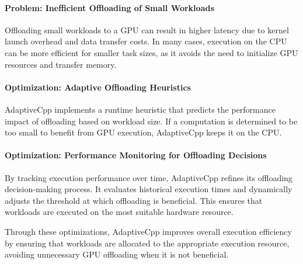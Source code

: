 \paragraph{Problem: Inefficient Offloading of Small Workloads}
Offloading small workloads to a GPU can result in higher latency due to kernel launch overhead and data transfer
costs. In many cases, execution on the CPU can be more efficient for smaller task sizes, as it avoids the need to
initialize GPU resources and transfer memory.

\paragraph{Optimization: Adaptive Offloading Heuristics}
AdaptiveCpp implements a runtime heuristic that predicts the performance impact of offloading based on workload
size. If a computation is determined to be too small to benefit from GPU execution, AdaptiveCpp keeps it on the CPU.

\paragraph{Optimization: Performance Monitoring for Offloading Decisions}
By tracking execution performance over time, AdaptiveCpp refines its offloading decision-making process. It evaluates
historical execution times and dynamically adjusts the threshold at which offloading is beneficial. This ensures that
workloads are executed on the most suitable hardware resource.

Through these optimizations, AdaptiveCpp improves overall execution efficiency by ensuring that workloads are
allocated to the appropriate execution resource, avoiding unnecessary GPU offloading when it is not beneficial.
